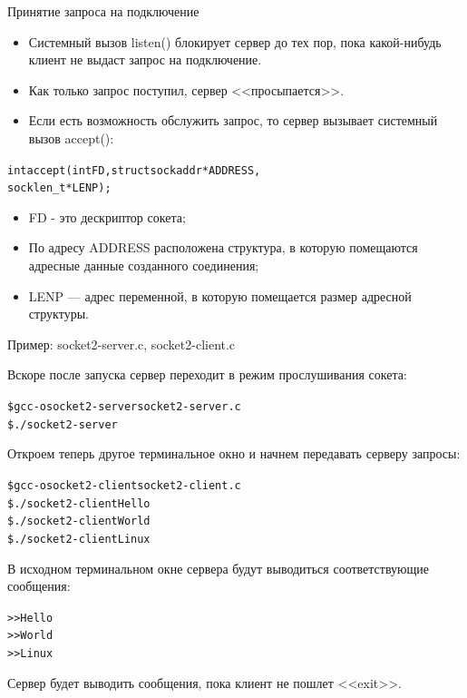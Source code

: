 \documentclass{beamer}
\begin{document}
\begin{frame}[fragile]{Принятие запроса на подключение}
	\begin{itemize}
		\item Системный вызов listen() блокирует сервер до тех пор, пока какой-нибудь клиент не выдаст запрос на подключение. 
		\item Как только запрос поступил, сервер <<просыпается>>. 
		\item Если есть возможность обслужить запрос, то сервер вызывает системный вызов accept():
	\end{itemize}	
	\begin{alltt}
		int accept (int FD, struct sockaddr * ADDRESS, 
		            socklen_t * LENP);
	\end{alltt}
	\begin{itemize}
		\item FD - это дескриптор сокета;
		\item По адресу ADDRESS расположена структура, в которую помещаются адресные данные созданного соединения; 
		\item LENP — адрес переменной, в которую помещается размер адресной структуры.
	\end{itemize}

\end{frame}

\begin{frame}[fragile]
	Пример: socket2-server.c, socket2-client.c

	Вскоре после запуска сервер переходит в режим прослушивания сокета:
	\begin{alltt}
	\$ gcc -o socket2-server socket2-server.c
	\$ ./socket2-server
	\end{alltt}
	Откроем теперь другое терминальное окно и начнем передавать серверу запросы:
	\begin{alltt}
	\$ gcc -o socket2-client socket2-client.c
	\$ ./socket2-client Hello
	\$ ./socket2-client World
	\$ ./socket2-client Linux
	\end{alltt}	
	В исходном терминальном окне сервера будут выводиться соответствующие сообщения:
	\begin{alltt}
	>> Hello
	>> World
	>> Linux
	\end{alltt}	
	Сервер будет выводить сообщения, пока клиент не пошлет <<exit>>.
\end{frame}
\end{document}
